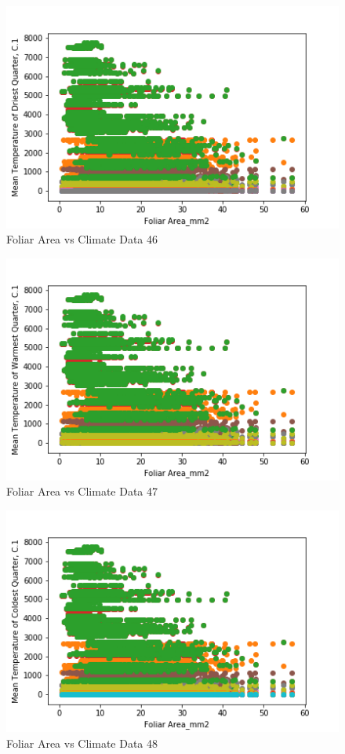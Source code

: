 \documentclass[letterpaper]{article}
\begin{document}
\begin{figure}[h]
\caption{Foliar Area vs Climate Data 46\label{fig:Foliar_Area_vs_46}}
\centering
\includegraphics[width=0.7\paperwidth]{Foliar_Area_vs_46}
\end{figure}


\begin{figure}[h]
\caption{Foliar Area vs Climate Data 47\label{fig:Foliar_Area_vs_47}}
\centering
\includegraphics[width=0.7\paperwidth]{Foliar_Area_vs_47}
\end{figure}


\begin{figure}[h]
\caption{Foliar Area vs Climate Data 48\label{fig:Foliar_Area_vs_48}}
\centering
\includegraphics[width=0.7\paperwidth]{Foliar_Area_vs_48}
\end{figure}
\end{document}
